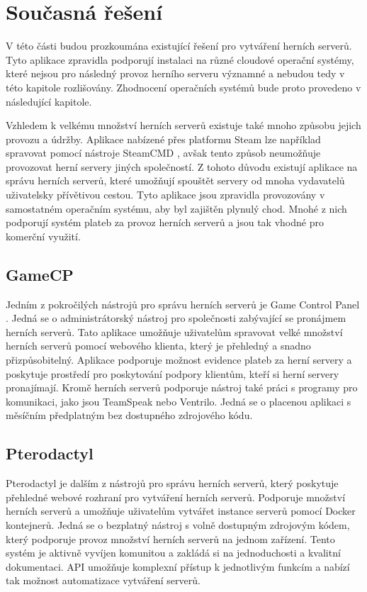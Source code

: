 \chapter[Současná řešení]{Současná řešení}

V této části budou prozkoumána existující řešení pro vytváření herních serverů. Tyto aplikace zpravidla podporují instalaci na různé cloudové operační systémy,
které nejsou pro následný provoz herního serveru významné a nebudou tedy v této kapitole rozlišovány. Zhodnocení operačních systémů bude proto provedeno v následující kapitole.

Vzhledem k velkému množství herních serverů existuje také mnoho způsobu jejich provozu a údržby. Aplikace nabízené přes platformu Steam
lze například spravovat pomocí nástroje SteamCMD \cite{steamcmd}, avšak tento způsob neumožňuje provozovat herní servery jiných společností.
Z tohoto důvodu existují aplikace na správu herních serverů, které umožňují spouštět servery od mnoha vydavatelů uživatelsky přívětivou cestou.
Tyto aplikace jsou zpravidla provozovány v samostatném operačním systému, aby byl zajištěn plynulý chod.
Mnohé z nich podporují systém plateb za provoz herních serverů a jsou tak vhodné pro komerční využití.

\section{GameCP}

Jedním z pokročilých nástrojů pro správu herních serverů je Game Control Panel \cite{gamecp}. Jedná se o administrátorský nástroj pro společnosti
zabývající se pronájmem herních serverů. Tato aplikace umožňuje uživatelům spravovat velké množství herních serverů pomocí webového klienta,
který je přehledný a snadno přizpůsobitelný. Aplikace podporuje možnost evidence plateb za herní servery a poskytuje prostředí pro poskytování
podpory klientům, kteří si herní servery pronajímají. Kromě herních serverů podporuje nástroj také práci s programy pro komunikaci, jako jsou TeamSpeak
nebo Ventrilo. Jedná se o placenou aplikaci s měsíčním předplatným bez dostupného zdrojového kódu.

\section{Pterodactyl}

Pterodactyl \cite{pterodactyl} je dalším z nástrojů pro správu herních serverů, který poskytuje přehledné webové rozhraní pro vytváření herních serverů.
Podporuje množství herních serverů a umožňuje uživatelům vytvářet instance serverů pomocí Docker kontejnerů. Jedná se o bezplatný nástroj
s volně dostupným zdrojovým kódem, který podporuje provoz množství herních serverů na jednom zařízení. Tento systém je aktivně vyvíjen komunitou
a zakládá si na jednoduchosti a kvalitní dokumentaci. API umožňuje komplexní přístup k jednotlivým funkcím a nabízí tak možnost automatizace
vytváření serverů.

